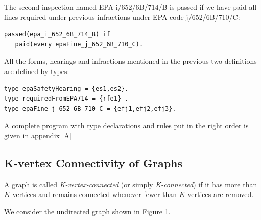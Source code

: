 \documentclass[a4paper,10pt]{article}
\providecommand{\DIFaddbegin}{} %
\providecommand{\DIFaddend}{} %
\providecommand{\DIFdelbegin}{} %
\providecommand{\DIFdelend}{} %
\begin{document}
\medskip\noindent
The second inspection named  EPA i/652/6B/714/B is passed if we have paid all fines 
required under previous infractions under EPA code j/652/6B/710/C:

\begin{verbatim}
passed(epa_i_652_6B_714_B) if
   paid(every epaFine_j_652_6B_710_C).
\end{verbatim}

\medskip\noindent
All the forms, hearings and infractions mentioned in the previous two definitions are defined by types:

\DIFdelbegin %
\DIFdelend \DIFaddbegin \begin{verbatim}
type epaSafetyHearing = {es1,es2}.
type requiredFromEPA714 = {rfe1} .
type epaFine_j_652_6B_710_C = {efj1,efj2,efj3}.
\end{verbatim}
\DIFaddend 

\medskip\noindent
A complete program with type declarations and rules put in the right order is given in appendix \ref{A}

\subsection{K-vertex Connectivity of Graphs}

A graph is called \textit{K-vertex-connected} (or simply \textit{K-connected})  if it has more than $K$ vertices and remains connected whenever fewer than $K$ vertices are removed.

\medskip\noindent
We consider the undirected graph shown in Figure 1.
\end{document}
